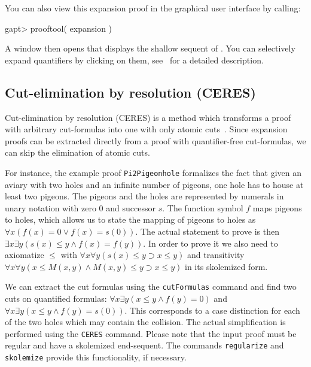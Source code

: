 \documentclass[a4paper,11pt]{article}
\newcommand{\impl}{\supset} %
\renewcommand{\land}{\wedge}
\renewcommand{\lor}{\vee}
\newcommand{\cli}[1]{{\ttfamily {#1}}}
\begin{document}
You can also view this expansion proof in the graphical user interface by
calling:
\begin{clilisting}
gapt> prooftool( expansion )

\end{clilisting}

A window then opens that displays the shallow sequent of \cli{expansion}.  You
can selectively expand quantifiers by clicking on them,
see~\cite{Hetzl13Understanding} for a detailed description.

\subsection{Cut-elimination by resolution (CERES)}\label{sec:ceres}

Cut-elimination by resolution (CERES) is a method which transforms a
proof with arbitrary cut-formulas into one with only atomic cuts~\cite{Baaz00CutElimination,Baaz2011}. Since
expansion proofs can be extracted directly from a proof with quantifier-free
cut-formulas, we can skip the elimination of atomic cuts.

For instance, the example proof \texttt{Pi2Pigeonhole} formalizes
 the fact that given an aviary with two holes and an infinite number
 of pigeons, one hole has to house at least two pigeons. The pigeons and
 the holes are represented by numerals in unary notation with zero $0$ and
 successor $s$. The function symbol $f$ maps pigeons to holes, which allows us
 to state the mapping of pigeons to holes as
 $\forall x (f(x) = 0 \lor f(x) = s(0))$. The actual statement to prove is then
 $\exists x \exists y (s(x) \leq y \land f(x) = f(y))$. In order to prove it
 we also need to axiomatize $\leq$ with
 $\forall x \forall y (s(x) \leq y \impl x \leq y)$ and transitivity
 $\forall x \forall y (x \leq M(x,y) \land M(x,y) \leq y \impl x \leq y)$ in its
 skolemized form.

We can extract the cut formulas using the \texttt{cutFormulas} command and find two
 cuts on quantified formulas: $\forall x \exists y (x \leq y \land f(y) = 0)$
 and $\forall x \exists y (x \leq y \land f(y) = s(0))$. This corresponds to a
 case distinction for each of the two holes which may contain the collision.
The actual simplification is performed using the \texttt{CERES} command. Please note
 that the input proof must be regular and have a skolemized end-sequent. The
 commands \texttt{regularize} and \texttt{skolemize} provide this functionality,
 if necessary.
\end{document}
